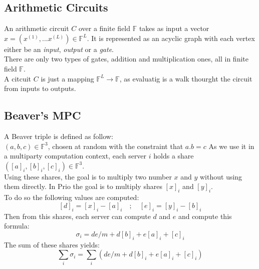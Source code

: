 \documentclass{article}
\begin{document}
\subsection*{Arithmetic Circuits}
An arithmetic circuit $C$ over a finite field $\mathbb{F}$ takes as input a vector $x = (x^{(1)},...x^{(L)}) \in \mathbb{F}^L $. It is represented as an acyclic graph with each vertex either be an \textit{input}, \textit{output} or a \textit{gate}.\\
There are only two types of gates, addition and multiplication ones, all in finite field $\mathbb{F}$.\\
A citcuit $C$ is just a mapping $\mathbb{F}^L \rightarrow \mathbb{F}$, as evaluatig is a walk thourght the circuit from inputs to outputs.

\subsection*{Beaver's MPC}
A Beaver triple is defined as follow:\\
$(a,b,c) \in \mathbb{F}^3$, chosen at random with the constraint that $a . b = c$
As we use it in a multiparty computation context, each server $i$ holds a share $([a]_i , [b]_i , [c]_i) \in \mathbb{F}^3$.\\
Using these shares, the goal is to multiply two number $x$ and $y$ without using them directly. In Prio the goal is to multiply shares $[x]_i$ and $[y]_i$.\\
To do so the following values are computed:
$$[d]_i = [x]_i -[a]_i  \quad  ;  \quad  [e]_i = [y]_i - [b]_i$$ 
Then from this shares, each server can compute $d$ and $e$ and compute this formula:\\
$$\sigma_i = de/m + d[b]_i +e[a]_i + [c]_i$$
The sum of these shares yields: $$ \sum_{i} \sigma_i = \sum_{i}{(de/m +d[b]_i + e[a]_i + [c]_i)} $$
\end{document}
